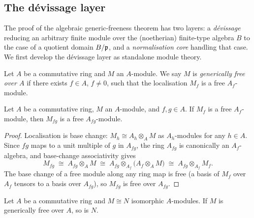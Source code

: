 \subsection{The dévissage layer}
\label{sec:generic_freeness_devissage}

The proof of the algebraic generic-freeness theorem has two layers: a
\emph{dévissage} reducing an arbitrary finite module over the (noetherian)
finite-type algebra \(B\) to the case of a quotient domain \(B/\mathfrak{p}\), and a
\emph{normalisation core} handling that case. We first develop the dévissage
layer as standalone module theory.

\begin{definition}\leanok
  \label{def:generically_free}
  Let \(A\) be a commutative ring and \(M\) an \(A\)-module.  We say \(M\) is
  \emph{generically free over \(A\)} if there exists \(f \in A\), \(f \ne 0\),
  such that the localisation \(M_f\) is a free \(A_f\)-module.
\end{definition}

\begin{lemma}\leanok
  \label{lem:generically_free_transport}
  Let \(A\) be a commutative ring, \(M\) an \(A\)-module, and \(f, g \in A\).
  If \(M_f\) is a free \(A_f\)-module, then \(M_{fg}\) is a free
  \(A_{fg}\)-module.
\end{lemma}

\begin{proof}
\leanok
  Localisation is base change: \(M_h \cong A_h \otimes_A M\) as
  \(A_h\)-modules for any \(h \in A\).  Since \(fg\) maps to a unit multiple
  of \(g\) in \(A_{fg}\), the ring \(A_{fg}\) is canonically an
  \(A_f\)-algebra, and base-change associativity gives
  \[
    M_{fg} \;\cong\; A_{fg} \otimes_A M
    \;\cong\; A_{fg} \otimes_{A_f} \bigl(A_f \otimes_A M\bigr)
    \;\cong\; A_{fg} \otimes_{A_f} M_f .
  \]
  The base change of a free module along any ring map is free (a basis of
  \(M_f\) over \(A_f\) tensors to a basis over \(A_{fg}\)), so \(M_{fg}\) is
  free over \(A_{fg}\).
\end{proof}

\begin{lemma}\leanok
  \label{lem:generically_free_of_equiv}
  Let \(A\) be a commutative ring and \(M \cong N\) isomorphic \(A\)-modules.
  If \(M\) is generically free over \(A\), so is \(N\).
\end{lemma}

